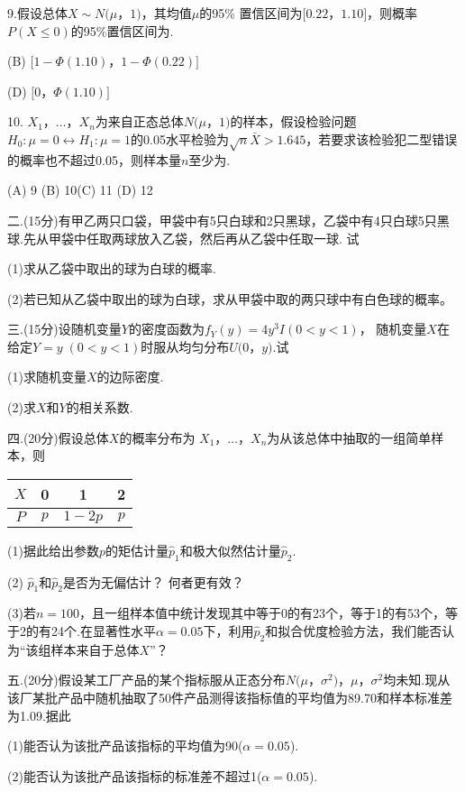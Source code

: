 \documentclass[12pt]{article}
\newcommand{\mline}{\underline{\hspace{4em}}}
\newcommand{\abcdf}[4]{(A) #1 \hfill (B) #2\hfill (C) #3 \hfill (D) #4\hfill}
\newcommand{\abcdt}[4]{\makebox[6.4cm][l]{(A) #1}(B) #2

\makebox[6.4cm][l]{(C) #3}(D) #4}
\begin{document}
9.假设总体$X\sim N(\mu$，$1)$，其均值$\mu$的95\% 置信区间为$[0.22$，$1.10]$，则概率$P(X\le 0)$的95\%置信区间为\mline .

\abcdt{$[\Phi(0.22)$，$\Phi(1.10)]$}{$[1-\Phi(1.10)$，$1-\Phi(0.22)]$}{$[0.22$，$1.10]$}{$[0$，$\Phi(1.10)]$}

10. $X_1$，$\ldots$，$X_n$为来自正态总体$N(\mu$，$1)$的样本，假设检验问题$H_0:\mu=0\leftrightarrow H_1:\mu=1$的0.05水平检验为$\sqrt{n}\bar{X}>1.645$，若要求该检验犯二型错误的概率也不超过0.05，则样本量$n$至少为\mline .

  \abcdf{9}{10}{11}{12}


二.(15分)有甲乙两只口袋，甲袋中有5只白球和2只黑球，乙袋中有4只白球5只黑球.先从甲袋中任取两球放入乙袋，然后再从乙袋中任取一球.
试

(1)求从乙袋中取出的球为白球的概率.

(2)若已知从乙袋中取出的球为白球，求从甲袋中取的两只球中有白色球的概率。


三.(15分)设随机变量$Y$的密度函数为$f_Y(y)=4y^3I(0<y<1)$，
随机变量$X$在给定$Y=y\;(0<y<1)$时服从均匀分布$U(0$，$y)$.试

(1)求随机变量$X$的边际密度.

(2)求$X$和$Y$的相关系数.


四.(20分)假设总体$X$的概率分布为
$X_1$，$\ldots$，$X_n$为从该总体中抽取的一组简单样本，则
\begin{table}[htbp!]
\centering
\begin{tabular}{c|ccc}
\hline
$X$& 0 & 1 & 2 \\\hline
 $P$&$p$&$1-2p$&$p$\\\hline
\end{tabular}
\end{table}

(1)据此给出参数$p$的矩估计量$\hat p_1$和极大似然估计量${\hat p}_2$.

(2) $\hat p_1$和${\hat p}_2$是否为无偏估计？ 何者更有效？

(3)若$n=100$，且一组样本值中统计发现其中等于0的有23个，等于1的有53个，等于2的有24个.在显著性水平$\alpha=0.05$下，利用${\hat p}_2$和拟合优度检验方法，我们能否认为“该组样本来自于总体$X$”？



五.(20分)假设某工厂产品的某个指标服从正态分布$N(\mu$，$\sigma^2)$，$\mu$，$\sigma^2$均未知.现从该厂某批产品中随机抽取了50件产品测得该指标值的平均值为89.70和样本标准差为1.09.据此

(1)能否认为该批产品该指标的平均值为90($\alpha=0.05$).

(2)能否认为该批产品该指标的标准差不超过1($\alpha=0.05$).
\end{document}
